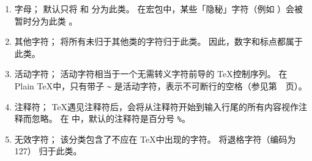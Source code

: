 \documentclass{book}
\begin{document}
\begin{enumerate}
\item{}\label{ini:let}字母；
        \IniTeX 默认只将  和  分为此类。
        在宏包中，某些「隐秘」字符（例如 ）会被暂时分为此类%
        。
\item{}\label{ini:other}其他字符；
        \IniTeX 将所有未归于其他类的字符归于此类。
        因此，数字和标点都属于此类。
\item{}活动字符；
        活动字符相当于一个无需转义字符前导的 \TeX 控制序列。
        在 Plain \TeX 中，只有带子 \verb_~_ 是活动字符，表示不可断行的空格（参见第~\pageref{tie}~页）。
\item{}\label{ini:comm}注释符；
        \TeX 遇见注释符后，会将从注释符开始到输入行尾的所有内容视作注释而忽略。
        在 \IniTeX 中，默认的注释符是百分号 \verb-%-。
\item{}\label{ini:invalid}无效字符；
        该分类包含了不应在 \TeX 中出现的字符。
        \IniTeX 将退格字符（\ascii 编码为 127） 归于此类。
\end{enumerate}
\end{document}
